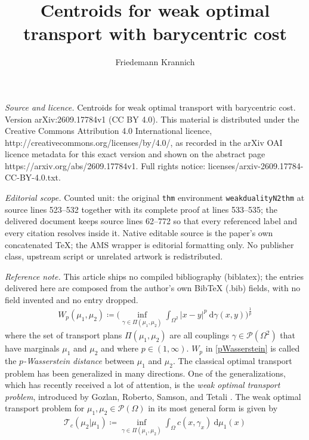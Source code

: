 \documentclass[10pt,a4paper]{amsart}
\newcommand{\dd}{\mathrm{d}}
\begin{document}
\title[Centroids for weak optimal transport with barycentric cost]{Centroids for weak optimal transport with barycentric cost}
\author{Friedemann Krannich}
\date{}
\maketitle
\noindent\emph{Source and licence.} Centroids for weak optimal transport with barycentric cost. Version arXiv:2609.17784v1 (CC BY 4.0). This material is distributed under the Creative Commons Attribution 4.0 International licence, http://creativecommons.org/licenses/by/4.0/, as recorded in the arXiv OAI licence metadata for this exact version and shown on the abstract page https://arxiv.org/abs/2609.17784v1. Full rights notice: licenses/arxiv-2609.17784-CC-BY-4.0.txt.\par\smallskip
\noindent\textit{Editorial scope.} Counted unit: the original \texttt{thm} environment \texttt{weakdualityN2thm} at source lines 523--532 together with its complete proof at lines 533--535; the delivered document keeps source lines 62--772 so that every referenced label and every citation resolves inside it. Native editable source is the paper's own concatenated TeX; the AMS wrapper is editorial formatting only. No publisher class, upstream script or unrelated artwork is redistributed.
\par\smallskip\noindent\textit{Reference note.} This article ships no compiled bibliography (biblatex); the entries delivered here are composed from the author's own BibTeX (.bib) fields, with no field invented and no entry dropped.
\begin{gather}\label{pWasserstein}
	W_p(\mu_1,\mu_2)\coloneqq \Big(\inf_{\gamma\in\Pi(\mu_1,\mu_2)}\int_{\Omega^2} |x-y|^p\ \dd\gamma(x,y)\Big)^{\frac{1}{p}}
\end{gather}
where the set of transport plans $\Pi(\mu_1,\mu_2)$ are all couplings $\gamma\in\mathcal P(\Omega^2)$ that have marginals $\mu_1$ and $\mu_2$ and where $p\in (1,\infty)$. $W_p$ in \eqref{pWasserstein} is called the \textit{$p$-Wasserstein distance} between $\mu_1$ and $\mu_2$. The classical optimal transport problem has been generalized in many directions. One of the generalizations, which has recently received a lot of attention, is the \textit{weak optimal transport problem}, introduced by Gozlan, Roberto, Samson, and Tetali \cite{gozlan2017}. The weak optimal transport problem for $\mu_1,\mu_2\in\mathcal P(\Omega)$ in its most general form is given by
\begin{gather*}
	\mathcal T_c(\mu_2|\mu_1)\coloneqq \inf_{\gamma\in\Pi(\mu_1,\mu_2)}\int_{\Omega}c(x,\gamma_x)\ \dd\mu_1(x)
\end{gather*}
\end{document}
